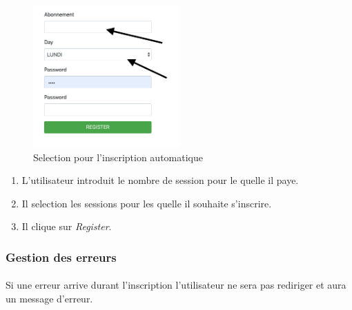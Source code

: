 \begin{figure}[h]
	\includegraphics[width=0.5\textwidth,center]{Figures/us4-1}
	\caption{Selection pour l'inscription automatique}
\end{figure}

\begin{enumerate}
	\item L'utilisateur introduit le nombre de session pour le quelle il paye.
	\item Il selection les sessions pour les quelle il souhaite s'inscrire.
	\item Il clique sur \textit{Register}.
\end{enumerate}

\subsubsection{Gestion des erreurs}
	\paragraph{}
		Si une erreur arrive durant l'inscription l'utilisateur ne sera pas rediriger et aura un message d'erreur. 
	
